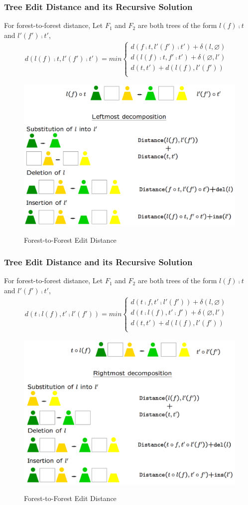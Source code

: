 \documentclass{beamer}
\begin{document}
\begin{frame}
\frametitle{Tree Edit Distance and its Recursive Solution}
For forest-to-forest distance,
Let $F_1$ and $F_2$ are both trees of the form $l(f) \comp t$ and $l'(f') \comp t'$, 
\begin{align*}
d(l(f) \comp t, l'(f') \comp t') = min \begin{cases}
	  	d(f \comp t, l'(f') \comp t') + \delta(l, \varnothing) \\ 
      	d(l(f) \comp t, f' \comp t') + \delta(\varnothing, l') \\ 
    	d(t, t') + d(l(f), l'(f')) & \\
    \end{cases}
\end{align*}
\begin{figure}
	\includegraphics[width=0.6\linewidth]{ForestLeftmostDecomposition}
	\label{Forest-to-Forest Edit Distance} 
	\caption{Forest-to-Forest Edit Distance}
	\centering
\end{figure}
\end{frame}
\begin{frame}
\frametitle{Tree Edit Distance and its Recursive Solution}
For forest-to-forest distance,
Let $F_1$ and $F_2$ are both trees of the form $l(f) \comp t$ and $l'(f') \comp t'$, 
\begin{align*}
d(t \comp l(f), t' \comp l'(f')) = min \begin{cases}
	  	d(t  \comp f, t' \comp l'(f')) + \delta(l, \varnothing) \\ 
      	d(t \comp l(f), t'  \comp f') + \delta(\varnothing, l') \\ 
    	d(t, t') + d(l(f), l'(f')) & \\
    \end{cases}
\end{align*}
\begin{figure}
	\includegraphics[width=0.55\linewidth]{ForestRightmostDecomposition}
	\label{Forest-to-Forest Edit Distance} 
	\caption{Forest-to-Forest Edit Distance}
	\centering
\end{figure}
\end{frame}
\end{document}
